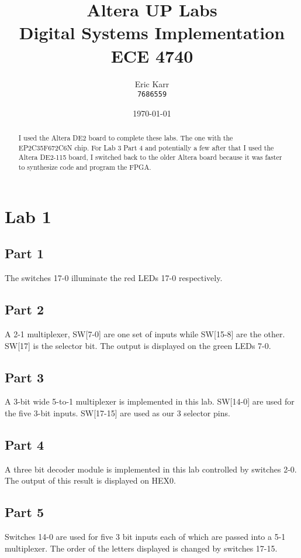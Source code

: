 \documentclass[oneside,letterpaper,12pt,titlepage]{article}
\begin{document}
\author{Eric Karr\\\texttt{7686559}}
\title{Altera UP Labs\\Digital Systems Implementation\\ECE 4740}
\date{\today}

\maketitle

\begin{abstract}
I used the Altera DE2 board to complete these labs. The one with the EP2C35F672C6N chip. For Lab 3 Part 4 and potentially a few after that I used the Altera DE2-115 board, I switched back to the older Altera board because it was faster to synthesize code and program the FPGA.
\end{abstract}

\section{Lab 1}

\subsection{Part 1}
The switches 17-0 illuminate the red LEDs 17-0 respectively.

\subsection{Part 2}
A 2-1 multiplexer, SW[7-0] are one set of inputs while SW[15-8] are the other. SW[17] is the selector bit. The output is displayed on the green LEDs 7-0.

\subsection{Part 3}
A 3-bit wide 5-to-1 multiplexer is implemented in this lab. SW[14-0] are used for the five 3-bit inputs. SW[17-15] are used as our 3 selector pins.

\subsection{Part 4}
A three bit decoder module is implemented in this lab controlled by switches 2-0. The output of this result is displayed on HEX0.

\subsection{Part 5}
Switches 14-0 are used for five 3 bit inputs each of which are passed into a 5-1 multiplexer. The order of the letters displayed is changed by switches 17-15. 
\end{document}
